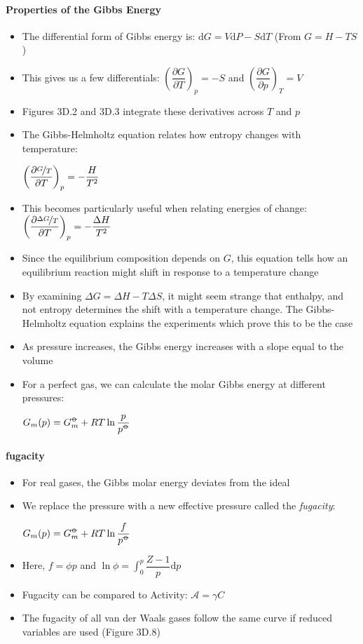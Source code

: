 \documentclass[12pt, openany, letterpaper]{memoir}
\begin{document}
\paragraph{Properties of the Gibbs Energy}
\begin{itemize}
	\item The differential form of Gibbs energy is: $\mathrm{d}G = V\mathrm{d}P-S\mathrm{d}T$ (From $G=H-TS$)
	\item This gives us a few differentials: $\left(\dfrac{\partial G}{\partial T}\right)_p = -S$ and $\left(\dfrac{\partial G}{\partial p}\right)_T = V$
	\item Figures 3D.2 and 3D.3 integrate these derivatives across $T$ and $p$
	\item The Gibbs-Helmholtz equation relates how entropy changes with temperature: 
	
	$\left(\dfrac{\partial \nicefrac{G}{T}}{\partial T}\right)_p = -\dfrac{H}{T^2}$
	\item This becomes particularly useful when relating energies of change: $\left(\dfrac{\partial \nicefrac{\Delta G}{T}}{\partial T}\right)_p = -\dfrac{\Delta H}{T^2}$
	\item Since the equilibrium composition depends on $G$, this equation tells how an equilibrium reaction might shift in response to a temperature change
	\item By examining $\Delta G = \Delta H - T\Delta S$, it might seem strange that enthalpy, and not entropy determines the shift with a temperature change. The Gibbs-Helmholtz equation explains the experiments which prove this to be the case
	\item As pressure increases, the Gibbs energy increases with a slope equal to the volume
	\item For a perfect gas, we can calculate the molar Gibbs energy at different pressures:
	
	 $G_m(p)=G_m^{\std}+RT\ln\dfrac{p}{p^{\std}}$
\end{itemize}
\paragraph{fugacity}
\begin{itemize}
	\item For real gases, the Gibbs molar energy deviates from the ideal
	\item We replace the pressure with a new effective pressure called the \emph{fugacity}:
	
	$G_m(p)=G_m^{\std}+RT\ln\dfrac{f}{p^{\std}}$
	\item Here, $f = \phi p$ and $\ln\phi = \displaystyle\int_0^p \dfrac{Z-1}{p}\mathrm{d}p$
	\item Fugacity can be compared to Activity: $\mathcal{A} = \gamma C$
	\item The fugacity of all van der Waals gases follow the same curve if reduced variables are used (Figure 3D.8)
\end{itemize}
\end{document}
